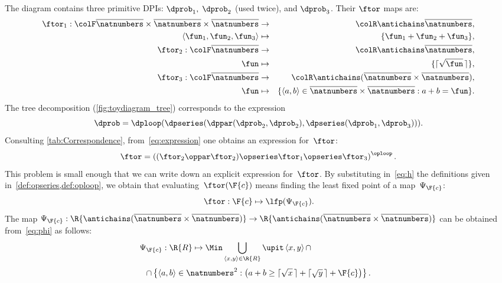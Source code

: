 The diagram contains three primitive DPIs: $\dprob_{1},$
$\dprob_{2}$ (used twice), and $\dprob_{3}$. Their $\ftor$ maps
are:
\begin{eqnarray*}
    \ftor_{1}:{\colF\overline{\natnumbers}\times\overline{\natnumbers}\times\overline{\natnumbers}} & \rightarrow & {\colR\antichains\overline{\natnumbers}},\\
    \left\langle \fun_{1},\fun_{2},\fun_{3}\right\rangle  & \mapsto & \{\fun_{1}+\fun_{2}+\fun_{3}\},\\
    \ftor_{2}:{\colF\overline{\natnumbers}} & \rightarrow & {\colR\antichains\overline{\natnumbers}},\\
    \fun& \mapsto & \{\lceil\sqrt{\fun}\,\rceil\},\\
    \ftor_{3}:{\colF\overline{\natnumbers}} & \rightarrow & {\colR\antichains(\overline{\natnumbers}\times\overline{\natnumbers})},\\
    \fun& \mapsto & \{\left\langle a,b\right\rangle \in\overline{\natnumbers}\times\overline{\natnumbers}:a+b=\fun\}.
\end{eqnarray*}
The tree decomposition (\cref{fig:toydiagram_tree}) corresponds to
the expression
\begin{equation}
    \dprob=\dploop(\dpseries(\dppar(\dprob_{2},\dprob_{2}),\dpseries(\dprob_{1},\dprob_{3}))).\label{eq:expression}
\end{equation}
Consulting \cref{tab:Correspondence}, from~\cref{eq:expression}
one obtains an expression for~$\ftor$:
\begin{equation}
    \ftor=\left((\ftor_{2}\oppar\ftor_{2})\opseries\ftor_{1}\opseries\ftor_{3}\right)^{\oploop}.\label{eq:h}
\end{equation}
This problem is small enough that we can write down an explicit expression
for~$\ftor$. By substituting in~\cref{eq:h} the definitions given in~\cref{def:opseries,def:oploop}, we obtain that
evaluating~$\ftor(\F{c})$ means finding the least fixed point of a map~$\Psi_{\F{c}}$:
\[
    \ftor:\F{c}\mapsto\lfp(\Psi_{\F{c}}).
\]
The map $\Psi_{\F{c}}:\R{\antichains(\overline{\natnumbers}\times\overline{\natnumbers})}\rightarrow\R{\antichains(\overline{\natnumbers}\times\overline{\natnumbers})}$
can be obtained from~\cref{eq:phi} as follows:
\begin{equation}
    \Psi_{\F{c}}:\R{R}\mapsto\Min\bigcup_{\left\langle x,y\right\rangle \in\R{R}}\upit\left\langle x,y\right\rangle \cap\qquad\qquad\qquad\qquad
\end{equation}
\begin{equation}
    \cap\left\{ \left\langle a,b\right\rangle \in\natnumbers^{2}:\left(a+b\geq\lceil\sqrt{x}\,\rceil+\lceil\sqrt{y}\,\rceil+\F{c}\right)\right\}.
\end{equation}

